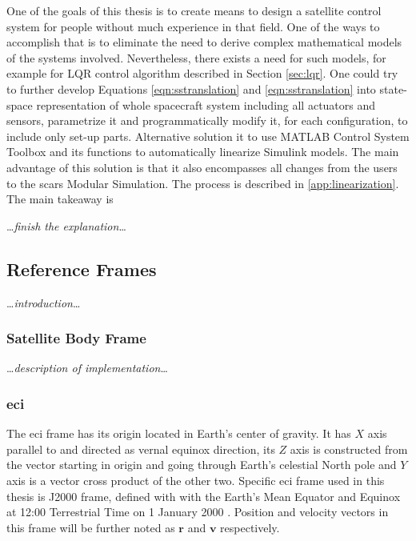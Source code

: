     One of the goals of this thesis is to create means to design a satellite control system for people without much experience in that field. One of the ways to accomplish that is to eliminate the need to derive complex mathematical models of the systems involved. Nevertheless, there exists a need for such models, for example for LQR control algorithm described in Section \ref{sec:lqr}. One could try to further develop Equations \ref{eqn:sstranslation} and \ref{eqn:sstranslation} into state-space representation of whole spacecraft system including all actuators and sensors, parametrize it and programmatically modify it, for each configuration, to include only set-up parts. Alternative solution it to use MATLAB Control System Toolbox and its functions to automatically linearize Simulink models. The main advantage of this solution is that it also encompasses all changes from the users to the \ac{scars} Modular Simulation. The process is described in \autoref{app:linearization}. The main takeaway is 
    
    \dots\textit{finish the explanation}\dots

\subsection{Reference Frames}
    \dots\textit{introduction}\dots

    \subsubsection{Satellite Body Frame}
    \dots\textit{description of implementation}\dots

    \subsubsection{\ac*{eci}}
        The \ac{eci} frame has its origin located in Earth's center of gravity. It has $X$ axis parallel to and directed as vernal equinox direction, its $Z$ axis is constructed from the vector starting in origin and going through Earth's celestial North pole and $Y$ axis is a vector cross product of the other two. Specific \ac{eci} frame used in this thesis is J2000 frame, defined with with the Earth's Mean Equator and Equinox at 12:00 Terrestrial Time on 1 January 2000 \cite{schutz2004statistical}. Position and velocity vectors in this frame will be further noted as $\textbf{r}$ and $\textbf{v}$ respectively.


